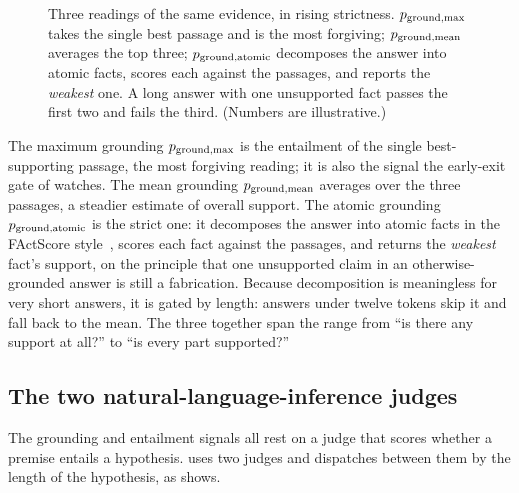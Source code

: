 \begin{figure}[htbp]
\caption[The grounding trio]{Three readings of the same evidence, in rising
strictness. $p_{\text{ground,max}}$ takes the single best passage and is the most forgiving;
$p_{\text{ground,mean}}$ averages the top three; $p_{\text{ground,atomic}}$ decomposes the answer into atomic facts,
scores each against the passages, and reports the \emph{weakest} one. A long answer
with one unsupported fact passes the first two and fails the third. (Numbers are
illustrative.)}
\label{fig:grounding-trio}
\end{figure}

\begin{precise}
The maximum grounding $p_{\text{ground,max}}$ is the entailment of the single best-supporting
passage, the most forgiving reading; it is also the signal the early-exit gate of
 watches. The mean grounding $p_{\text{ground,mean}}$ averages over
the three passages, a steadier estimate of overall support. The atomic grounding
$p_{\text{ground,atomic}}$ is the strict one: it decomposes the answer into atomic facts in the
FActScore style~\cite{min-etal-2023-factscore}, scores each fact against the
passages, and returns the \emph{weakest} fact's support, on the principle that one
unsupported claim in an otherwise-grounded answer is still a fabrication. Because
decomposition is meaningless for very short answers, it is gated by length: answers
under twelve tokens skip it and fall back to the mean. The three together span the
range from ``is there any support at all?'' to ``is every part supported?''
\end{precise}

\subsection*{The two natural-language-inference judges}

The grounding and entailment signals all rest on a judge that scores whether a
premise entails a hypothesis. \caem{} uses two judges and dispatches between them by
the length of the hypothesis, as  shows.

